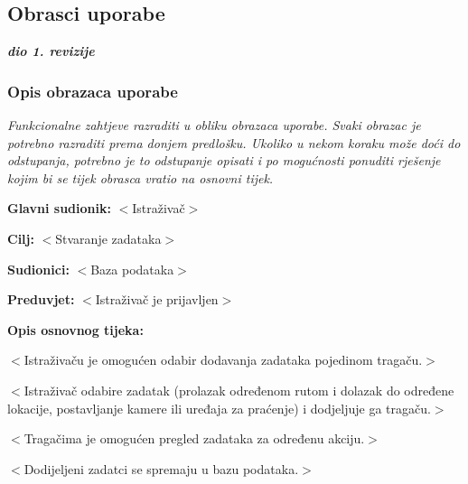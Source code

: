 			
			\eject 
			
			
				
			\subsection{Obrasci uporabe}
				
				\textbf{\textit{dio 1. revizije}}
				
				\subsubsection{Opis obrazaca uporabe}
					\textit{Funkcionalne zahtjeve razraditi u obliku obrazaca uporabe. Svaki obrazac je potrebno razraditi prema donjem predlošku. Ukoliko u nekom koraku može doći do odstupanja, potrebno je to odstupanje opisati i po mogućnosti ponuditi rješenje kojim bi se tijek obrasca vratio na osnovni tijek.}\\
					
					\noindent {}
					\begin{packed_item}
						
						\item \textbf{Glavni sudionik: }$<$Istraživač$>$
						\item  \textbf{Cilj:} $<$Stvaranje zadataka$>$
						\item  \textbf{Sudionici:} $<$Baza podataka$>$
						\item  \textbf{Preduvjet:} $<$Istraživač je prijavljen$>$
						\item  \textbf{Opis osnovnog tijeka:}
						
						\item[] \begin{packed_enum}
							
							\item $<$Istraživaču je omogućen odabir dodavanja zadataka pojedinom tragaču.$>$
							\item $<$Istraživač odabire zadatak (prolazak određenom rutom i dolazak do određene lokacije, postavljanje
							kamere ili uređaja za praćenje) i dodjeljuje ga tragaču.$>$
							\item $<$Tragačima je omogućen pregled zadataka za određenu akciju.$>$
							\item $<$Dodijeljeni zadatci se spremaju u bazu podataka.$>$
						\end{packed_enum}
						
					\end{packed_item}
					
